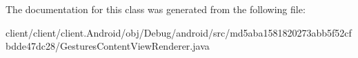 The documentation for this class was generated from the following file\+:\begin{DoxyCompactItemize}
\item 
client/client/client.\+Android/obj/\+Debug/android/src/md5aba1581820273abb5f52cfbdde47dc28/Gestures\+Content\+View\+Renderer.\+java\end{DoxyCompactItemize}
